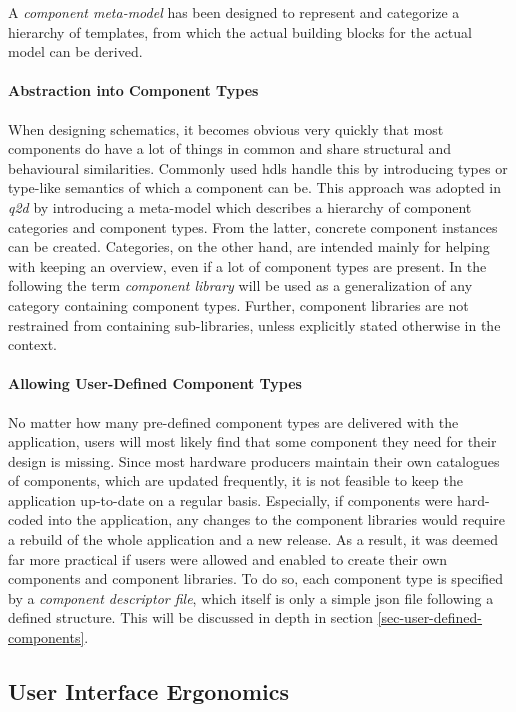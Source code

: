 	A \emph{component meta-model} has been designed to represent and categorize a hierarchy of templates, from which the actual building blocks for the actual model can be derived.
	 
	\paragraph{Abstraction into Component Types}
		When designing schematics, it becomes obvious very quickly that most components do have a lot of things in common and share structural and behavioural similarities.
		Commonly used \glspl{hdl} handle this by introducing types or type-like semantics of which a component can be.
		This approach was adopted in \emph{q2d} by introducing a meta-model which describes a hierarchy of component categories and component types.
		From the latter, concrete component instances can be created.
		Categories, on the other hand, are intended mainly for helping with keeping an overview, even if a lot of component types are present.
		In the following the term \emph{component library} will be used as a generalization of any category containing component types.
		Further, component libraries are not restrained from containing sub-libraries, unless explicitly stated otherwise in the context.
	
	\paragraph{Allowing User-Defined Component Types}
		No matter how many pre-defined component types are delivered with the application, users will most likely find that some component they need for their design is missing.
		Since most hardware producers maintain their own catalogues of components, which are updated frequently, it is not feasible to keep the application up-to-date on a regular basis.
		Especially, if components were hard-coded into the application, any changes to the component libraries would require a rebuild of the whole application and a new release.
		As a result, it was deemed far more practical if users were allowed and enabled to create their own components and component libraries.
		To do so, each component type is specified by a \emph{component descriptor file}, which itself is only a simple \gls{json} file following a defined structure.
		This will be discussed in depth in section \ref{sec-user-defined-components}.
		
\subsection{User Interface Ergonomics}
	\label{sec-ui-ergonomics}
	
